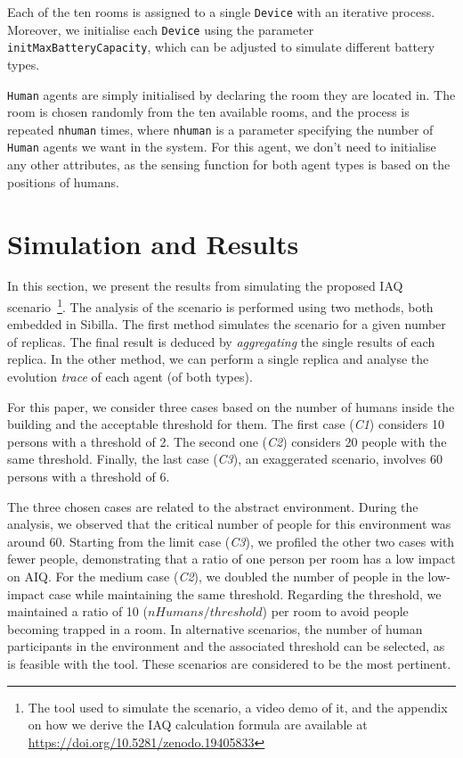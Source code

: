 \documentclass[runningheads]{llncs}
\newcommand{\sibilla}{\textsf{Sibilla}}
\begin{document}
Each of the ten rooms is assigned to a single \lstinline{Device} with an iterative process.
%
Moreover, we initialise each \lstinline{Device} using the parameter \lstinline{initMaxBatteryCapacity}, which can be adjusted to simulate different battery types.

\lstinline{Human} agents are simply initialised by declaring the room they are located in.
%
The room is chosen randomly from the ten available rooms, and the process is repeated \lstinline{nhuman} times, where \lstinline{nhuman} is a parameter specifying the number of \lstinline{Human} agents we want in the system.
%
For this agent, we don't need to initialise any other attributes, as the sensing function for both agent types is based on the positions of humans.

\section{Simulation and Results}\label{sec:sim}

In this section, we present the results from simulating the proposed IAQ scenario~\footnote{The tool used to simulate the scenario, a video demo of it, and the appendix on how we derive the IAQ calculation formula are available at \url{https://doi.org/10.5281/zenodo.19405833}}.
%
The analysis of the scenario is performed using two methods, both embedded in \sibilla{}.
%
The first method simulates the scenario for a given number of replicas. The final result is deduced by \emph{aggregating} the single results of each replica.
%
In the other method, we can perform a single replica and analyse the evolution \emph{trace} of each agent (of both types).

For this paper, we consider three cases based on the number of humans inside the building and the acceptable threshold for them.
%
The first case (\emph{C1}) considers 10 persons with a threshold of 2.
%
The second one (\emph{C2}) considers 20 people with the same threshold.
%
Finally, the last case (\emph{C3}), an exaggerated scenario, involves 60 persons with a threshold of 6.

The three chosen cases are related to the abstract environment. During the analysis, we observed that the critical number of people for this environment was around 60. Starting from the limit case (\emph{C3}), we profiled the other two cases with fewer people, demonstrating that a ratio of one person per room has a low impact on AIQ. For the medium case (\emph{C2}), we doubled the number of people in the low-impact case while maintaining the same threshold. Regarding the threshold, we maintained a ratio of 10 ($nHumans/threshold$) per room to avoid people becoming trapped in a room. In alternative scenarios, the number of human participants in the environment and the associated threshold can be selected, as is feasible with the tool. These scenarios are considered to be the most pertinent.
\end{document}

